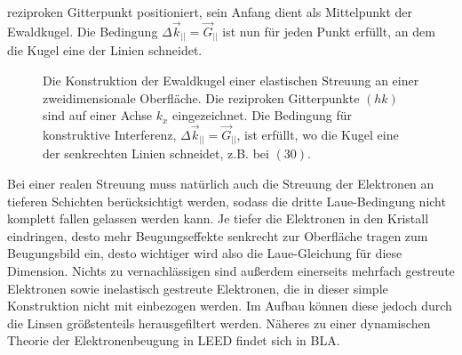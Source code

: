 reziproken Gitterpunkt positioniert, sein Anfang dient als Mittelpunkt der Ewaldkugel. Die
Bedingung $\Delta \vec{k}_{||}=\vec{G}_{||}$ ist nun für jeden Punkt erfüllt, an dem die Kugel eine
der Linien schneidet. 
\begin{figure}[H]
\centering

\caption{Die Konstruktion der Ewaldkugel einer elastischen Streuung an einer zweidimensionale Oberfläche. Die
reziproken Gitterpunkte $(hk)$ sind auf einer Achse $k_x$ eingezeichnet. Die Bedingung für konstruktive
Interferenz, $\Delta \vec{k}_{||}=\vec{G}_{||}$,  ist erfüllt, wo die Kugel eine der senkrechten Linien
schneidet, z.B. bei $(30)$. }
\label{ewald}
\end{figure}

Bei einer realen Streuung muss natürlich auch die Streuung der Elektronen an tieferen
Schichten berücksichtigt werden, sodass die dritte Laue-Bedingung nicht komplett fallen gelassen werden
kann. Je tiefer die Elektronen in den Kristall eindringen, desto mehr Beugungseffekte senkrecht zur
Oberfläche tragen zum Beugungsbild ein, desto wichtiger wird also die Laue-Gleichung für diese
Dimension. Nichts zu vernachlässigen sind außerdem einerseits mehrfach gestreute Elektronen sowie
inelastisch gestreute Elektronen, die in dieser simple Konstruktion nicht mit einbezogen werden. Im Aufbau
können diese jedoch durch die Linsen größstenteils herausgefiltert werden. Näheres zu einer dynamischen
Theorie der Elektronenbeugung in LEED findet sich in BLA.

\FloatBarrier










